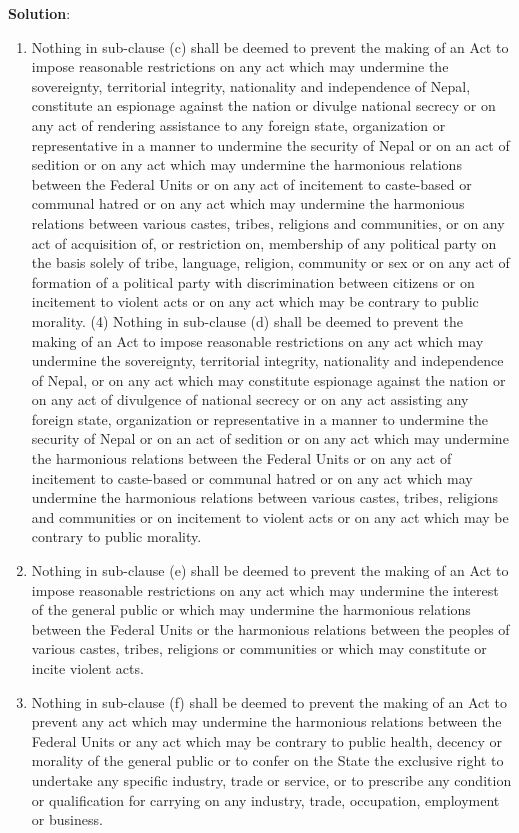 \documentclass[
]{book}
\newenvironment{solution}{ {\bfseries Solution}:}{}
\begin{document}
\begin{questions}
\begin{solution}
\begin{enumerate}
\begin{enumerate}
\item Nothing in sub-clause (c) shall be deemed to prevent the making of an Act to impose reasonable restrictions on any act which may undermine the sovereignty, territorial integrity, nationality and independence of Nepal, constitute an espionage against the nation or divulge national secrecy or on any act of rendering assistance to any foreign state, organization or representative in a manner to undermine the security of Nepal or on an act of sedition or on any act which may undermine the harmonious relations between the Federal Units or on any act of incitement to caste-based or communal hatred or on any act which may undermine the harmonious relations between various castes, tribes, religions and communities, or on any act of acquisition of, or restriction on, membership of any political party on the basis solely of tribe, language, religion, community or sex or on any act of formation of a political party with discrimination between citizens or on incitement to violent acts or on any act which may be contrary to public morality. (4) Nothing in sub-clause (d) shall be deemed to prevent the making of an Act to impose reasonable restrictions on any act which may undermine the sovereignty, territorial integrity, nationality and independence of Nepal, or on any act which may constitute espionage against the nation or on any act of divulgence of national secrecy or on any act assisting any foreign state, organization or representative in a manner to undermine the security of Nepal or on an act of sedition or on any act which may undermine the harmonious relations between the Federal Units or on any act of incitement to caste-based or communal hatred or on any act which may undermine the harmonious relations between various castes, tribes, religions and communities or on incitement to violent acts or on any act which may be contrary to public morality.
\item Nothing in sub-clause (e) shall be deemed to prevent the making of an Act to impose reasonable restrictions on any act which may undermine the interest of the general public or which may undermine the harmonious relations between the Federal Units or the harmonious relations between the peoples of various castes, tribes, religions or communities or which may constitute or incite violent acts.
\item Nothing in sub-clause (f) shall be deemed to prevent the making of an Act to prevent any act which may undermine the harmonious relations between the Federal Units or any act which may be contrary to public health, decency or morality of the general public or to confer on the State the exclusive right to undertake any specific industry, trade or service, or to prescribe any condition or qualification for carrying on any industry, trade, occupation, employment or business.
\end{enumerate}


\end{enumerate}
\end{solution}
\end{questions}
\end{document}
